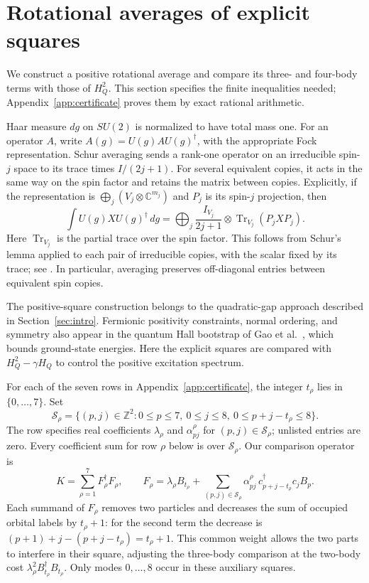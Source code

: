 \section{Rotational averages of explicit squares}
\label{sec:squares}
We construct a positive rotational average and compare its three- and four-body terms with those of $H_Q^2$. This section specifies the finite inequalities needed; Appendix~\ref{app:certificate} proves them by exact rational arithmetic.

Haar measure $dg$ on $SU(2)$ is normalized to have total mass one. For an operator $A$, write $A(g)=U(g)AU(g)^\dagger$, with the appropriate Fock representation. Schur averaging sends a rank-one operator on an irreducible spin-$j$ space to its trace times $I/(2j+1)$. For several equivalent copies, it acts in the same way on the spin
factor and retains the matrix between copies. Explicitly, if the
representation is $\bigoplus_j(V_j\otimes\mathbb C^{m_j})$ and $P_j$
is its spin-$j$ projection, then
\[
 \int U(g)XU(g)^\dagger\,dg
 =\bigoplus_j\frac{I_{V_j}}{2j+1}\otimes
            \operatorname{Tr}_{V_j}(P_jXP_j).
\]
Here $\operatorname{Tr}_{V_j}$ is the partial trace over the spin factor.
This follows from Schur's lemma applied to each pair of irreducible
copies, with the scalar fixed by its trace; see
\cite[Section~II.C]{BartlettRudolphSpekkens}. In particular, averaging
preserves off-diagonal entries between equivalent spin copies.

The positive-square construction belongs to the quadratic-gap approach
described in Section~\ref{sec:intro}. Fermionic positivity constraints,
normal ordering, and symmetry also appear in the quantum Hall bootstrap
of Gao et al.~\cite{GaoLanzettaLedwithWangKhalaf}, which bounds ground-state
energies. Here the explicit squares are compared with $H_Q^2-\gamma H_Q$
to control the positive excitation spectrum.

For each of the seven rows in Appendix~\ref{app:certificate}, the integer
$t_\rho$ lies in $\{0,\ldots,7\}$. Set
\[
 \mathcal S_\rho=\{(p,j)\in\mathbb Z^2:0\le p\le7,\ 0\le j\le8,\
                         0\le p+j-t_\rho\le8\}.
\]
The row specifies real coefficients $\lambda_\rho$ and
$\alpha^\rho_{pj}$ for $(p,j)\in\mathcal S_\rho$; unlisted entries are zero.
Every coefficient sum for row $\rho$ below is over $\mathcal S_\rho$.
Our comparison operator is
\begin{equation}\label{eq:F}
 K=\sum_{\rho=1}^7F_\rho^\dagger F_\rho,\qquad
 F_\rho=\lambda_\rho B_{t_\rho}
       +\sum_{(p,j)\in\mathcal S_\rho}\alpha^{\rho}_{pj}\,
                                  c_{p+j-t_\rho}^\dagger c_jB_p.
\end{equation}
Each summand of $F_\rho$ removes two particles and decreases the sum of
occupied orbital labels by $t_\rho+1$: for the second term the decrease is
$(p+1)+j-(p+j-t_\rho)=t_\rho+1$. This common weight allows the two parts
to interfere in their square, adjusting the three-body comparison at the
two-body cost $\lambda_\rho^2B_{t_\rho}^\dagger B_{t_\rho}$.
Only modes $0,\ldots,8$ occur in these auxiliary squares.

